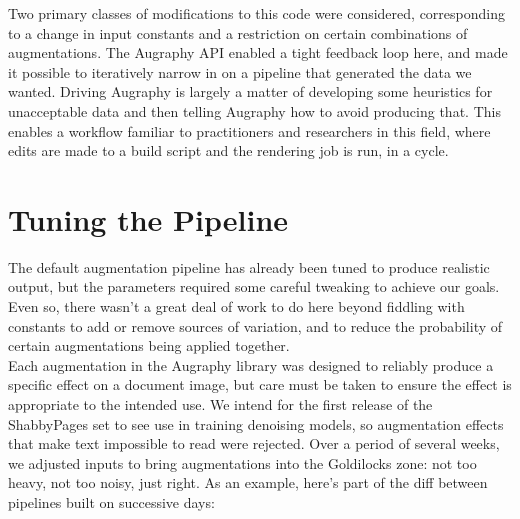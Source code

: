 \documentclass[runningheads]{llncs}
\begin{document}
Two primary classes of modifications to this code were considered, corresponding to a change in input constants and a restriction on certain combinations of augmentations. The Augraphy API enabled a tight feedback loop here, and made it possible to iteratively narrow in on a pipeline that generated the data we wanted. Driving Augraphy is largely a matter of developing some heuristics for unacceptable data and then telling Augraphy how to avoid producing that. This enables a workflow familiar to practitioners and researchers in this field, where edits are made to a build script and the rendering job is run, in a cycle.

\section{Tuning the Pipeline}
The default augmentation pipeline has already been tuned to produce realistic output, but the parameters required some careful tweaking to achieve our goals. Even so, there wasn't a great deal of work to do here beyond fiddling with constants to add or remove sources of variation, and to reduce the probability of certain augmentations being applied together.\\

Each augmentation in the Augraphy library was designed to reliably produce a specific effect on a document image, but care must be taken to ensure the effect is appropriate to the intended use. We intend for the first release of the ShabbyPages set to see use in training denoising models, so augmentation effects that make text impossible to read were rejected. Over a period of several weeks, we adjusted inputs to bring augmentations into the Goldilocks zone: not too heavy, not too noisy, just right. As an example, here's part of the diff between pipelines built on successive days:
\end{document}
